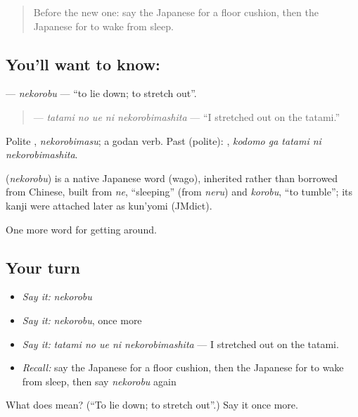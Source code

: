\label{lesson:JA-C399-nekorobu}



\begin{quote}
Before the new one: say the Japanese for a floor cushion, then the Japanese for to wake from sleep.
\end{quote}

\subsection*{You'll want to know: }
\textbf{} — \emph{nekorobu} — \textquotedblleft{}to lie down; to stretch out\textquotedblright{}.

\begin{quote}
\textbf{  } — \emph{tatami no ue ni nekorobimashita} — \textquotedblleft{}I stretched out on the tatami.\textquotedblright{}
\end{quote}

Polite \textbf{}, \emph{nekorobimasu}; a godan verb. Past (polite): \textbf{  }, \emph{kodomo ga tatami ni nekorobimashita}.

\begin{cousinweb}
\textbf{} (\emph{nekorobu}) is a native Japanese word (wago), inherited rather than borrowed from Chinese, built from \emph{ne}, \textquotedblleft{}sleeping\textquotedblright{} (from \emph{neru}) and \emph{korobu}, \textquotedblleft{}to tumble\textquotedblright{}; its kanji were attached later as kun'yomi (JMdict).
\end{cousinweb}

\begin{grammarlens}[title={What you've built}]
One more word for getting around.
\end{grammarlens}

\subsection*{Your turn}
\begin{itemize}
\raggedright
  \item \emph{Say it:} \emph{nekorobu}
  \item \emph{Say it:} \emph{nekorobu}, once more
  \item \emph{Say it:} \emph{tatami no ue ni nekorobimashita} — I stretched out on the tatami.
  \item \emph{Recall:} say the Japanese for a floor cushion, then the Japanese for to wake from sleep, then say \emph{nekorobu} again
\end{itemize}

\begin{tcolorbox}[breakable,colback=teal!4,colframe=teal!35!black,title={Before you move on}]
What does  mean? (\textquotedblleft{}To lie down; to stretch out\textquotedblright{}.) Say it once more.
\end{tcolorbox}
